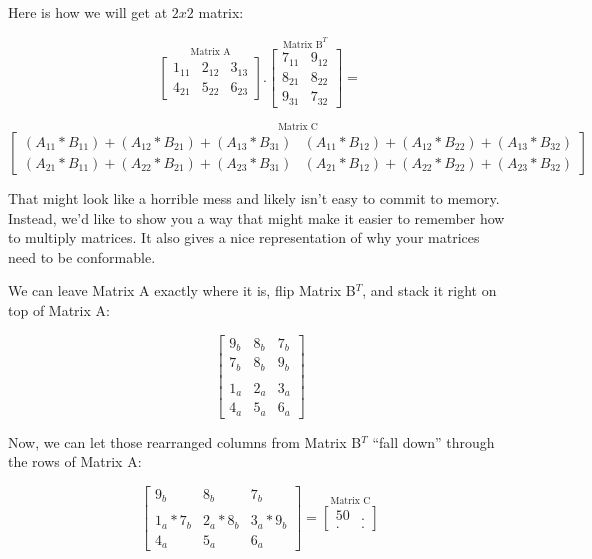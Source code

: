 \documentclass[
]{krantz}
\begin{document}
Here is how we will get at \(2x2\) matrix:

\[
\stackrel{\mbox{Matrix A}}{
\begin{bmatrix}
1_{11} & 2_{12} & 3_{13}\\
4_{21} & 5_{22} & 6_{23}
\end{bmatrix}
}
.
\stackrel{\mbox{Matrix B}^T}{
\begin{bmatrix}
7_{11} & 9_{12} \\ 
8_{21}& 8_{22}\\
9_{31} & 7_{32}
\end{bmatrix} 
}
=
\]

\[
\stackrel{\mbox{Matrix C}}{
\begin{bmatrix}
(A_{11}*B_{11})+(A_{12}*B_{21})+(A_{13}*B_{31}) & (A_{11}*B_{12})+(A_{12}*B_{22})+(A_{13}*B_{32}) \\
(A_{21}*B_{11})+(A_{22}*B_{21})+(A_{23}*B_{31}) & (A_{21}*B_{12})+(A_{22}*B_{22})+(A_{23}*B_{32})
\end{bmatrix} 
}
\]

That might look like a horrible mess and likely isn't easy to commit to
memory. Instead, we'd like to show you a way that might make it easier
to remember how to multiply matrices. It also gives a nice
representation of why your matrices need to be conformable.

We can leave Matrix A exactly where it is, flip Matrix B\(^T\), and
stack it right on top of Matrix A:

\[
\begin{bmatrix}
9_{b} & 8_{b} & 7_{b} \\
7_{b} & 8_{b} & 9_{b} \\
\\
1_{a} & 2_{a} & 3_{a} \\
4_{a} & 5_{a} & 6_{a}
\end{bmatrix}
\]

Now, we can let those rearranged columns from Matrix B\(^T\) ``fall
down'' through the rows of Matrix A:

\[
\begin{bmatrix}
9_{b} & 8_{b} & 7_{b} \\
\\
1_{a}*7_{b} & 2_{a}*8_{b} & 3_{a}*9_{b}\\
4_{a} & 5_{a} & 6_{a}
\end{bmatrix}
= 
\stackrel{\mbox{Matrix C}}{
\begin{bmatrix}
50 & .\\
. & .
\end{bmatrix}
}
\]
\end{document}
